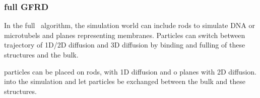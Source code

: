 \subsubsection{full GFRD}
In the full \GFRD\ algorithm, the simulation world can include rods to simulate DNA or microtubels and planes representing membranes. Particles can switch between trajectory of 1D/2D diffusion and 3D diffusion by binding and fulling of these structures and the bulk. 


particles can be placed on rods, with 1D diffusion and o planes with 2D diffusion.    into the simulation and let particles be exchanged between the bulk and these structures.









